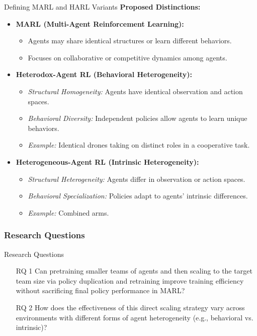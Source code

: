 \begin{frame}{Defining MARL and HARL Variants}
    \textbf{Proposed Distinctions:}
    \begin{itemize}
        \item \textbf{MARL (Multi-Agent Reinforcement Learning):}
        \begin{itemize}
            \item Agents may share identical structures or learn different behaviors.
            \item Focuses on collaborative or competitive dynamics among agents.
        \end{itemize}
        \item \textbf{Heterodox-Agent RL (Behavioral Heterogeneity):}
        \begin{itemize}
            \item \emph{Structural Homogeneity:} Agents have identical observation and action spaces.
            \item \emph{Behavioral Diversity:} Independent policies allow agents to learn unique behaviors.
            \item \textit{Example:} Identical drones taking on distinct roles in a cooperative task.
        \end{itemize}
        \item \textbf{Heterogeneous-Agent RL (Intrinsic Heterogeneity):}
        \begin{itemize}
            \item \emph{Structural Heterogeneity:} Agents differ in observation or action spaces.
            \item \emph{Behavioral Specialization:} Policies adapt to agents' intrinsic differences.
            \item \textit{Example:} Combined arms.
        \end{itemize}
    \end{itemize}
\end{frame}

\subsubsection{Research Questions}

\begin{frame}{Research Questions}
    \begin{enumerate}
        \item[RQ 1] {
            Can pretraining smaller teams of agents and then scaling to the target 
            team size via policy duplication and retraining improve training efficiency 
            without sacrificing final policy performance in MARL?}
        \item[RQ 2] {
            How does the effectiveness of this direct scaling strategy vary across 
            environments with different forms of agent heterogeneity 
            (e.g., behavioral vs. intrinsic)?}
    \end{enumerate}
\end{frame}

